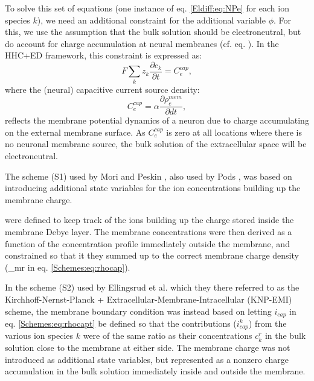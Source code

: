 To solve this set of equations (one instance of eq. \ref{Eldiff:eq:NPe} for each ion species $k$), we need an additional constraint for the additional variable $\phi$. For this, we use the assumption that the bulk solution should be electroneutral, but do account for charge accumulation at neural membranes (cf. eq. ). In the HHC+ED framework, this constraint is expressed as:
\begin{equation}
F \sum_k{z_k \frac{\partial c_k}{\partial t}} = C_e^{cap},
\label{Schemes:eq:electroneutral3}
\end{equation}
where the (neural) capacitive current source density:
\begin{equation}
C_e^{cap} = {\alpha}\frac{\partial \rho_e^{mem}}{\partial dt},
\label{Schemes:eq:Andreas}
\end{equation}
reflects the membrane potential dynamics of a neuron due to charge accumulating on the external membrane surface. As $C_e^{cap}$ is zero at all locations where there is no neuronal membrane source, the bulk solution of the extracellular space will be electroneutral.


The scheme (S1) used by Mori and Peskin \citep{Mori2006, Mori2009}, also used by Pods \citep{Pods2017}, was based on introducing additional state variables for the ion concentrations building up the membrane charge. 


were defined to keep track of the ions building up the charge stored inside the membrane Debye layer. The membrane concentrations were then derived as a function of the concentration profile immediately outside the membrane, and constrained so that it they summed up to the correct membrane charge density (\eta_{mr} in eq. \ref{Schemes:eq:rhocap}).

In the scheme (S2) used by Ellingsrud et al. \citep{ellingsrud2020} which they there referred to as the Kirchhoff-Nernst-Planck + Extracellular-Membrane-Intracellular (KNP-EMI) scheme, the membrane boundary condition was instead based on letting $i_{cap}$ in eq. \ref{Schemes:eq:rhocapt} be defined so that the contributions ($i^k_{cap}$) from the various ion species $k$ were of the same ratio as their concentrations $c_k^r$ in the bulk solution close to the membrane at either side. The membrane charge was not introduced as additional state variables, but represented as a nonzero charge accumulation in the bulk solution immediately inside and outside the membrane. 


